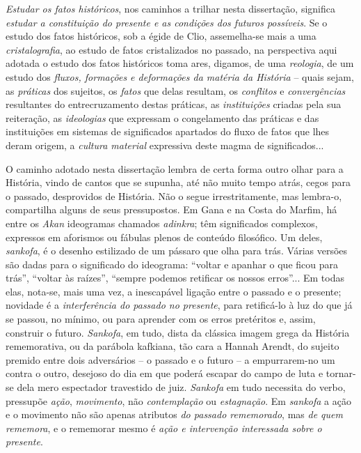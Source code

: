 \textit{Estudar os fatos históricos}, nos caminhos a trilhar nesta dissertação, significa \textit{estudar a constituição do presente e as condições dos futuros possíveis}. Se o estudo dos fatos históricos, sob a égide de Clio, assemelha-se mais a uma \textit{cristalografia}, ao estudo de fatos cristalizados no passado, na perspectiva aqui adotada o estudo dos fatos históricos toma ares, digamos, de uma \textit{reologia}, de um estudo dos \textit{fluxos, formações e deformações da matéria da História} – quais sejam, as \textit{práticas} dos sujeitos, os \textit{fatos} que delas resultam, os \textit{conflitos} e \textit{convergências} resultantes do entrecruzamento destas práticas, as \textit{instituições} criadas pela sua reiteração, as \textit{ideologias} que expressam o congelamento das práticas e das instituições em sistemas de significados apartados do fluxo de fatos que lhes deram origem, a \textit{cultura material} expressiva deste magma de significados...

O caminho adotado nesta dissertação lembra de certa forma outro olhar para a História, vindo de cantos que se supunha, até não muito tempo atrás, cegos para o passado, desprovidos de História. Não o segue irrestritamente, mas lembra-o, compartilha alguns de seus pressupostos. Em Gana e na Costa do Marfim, há entre os \textit{Akan} ideogramas chamados \textit{adinkra}; têm significados complexos, expressos em aforismos ou fábulas plenos de conteúdo filosófico. Um deles, \textit{sankofa}, é o desenho estilizado de um pássaro que olha para trás. Várias versões são dadas para o significado do ideograma: ``voltar e apanhar o que ficou para trás'', ``voltar às raízes'', ``sempre podemos retificar os nossos erros''... Em todas elas, nota-se, mais uma vez, a inescapável ligação entre o passado e o presente; novidade é a \textit{interferência do passado no presente}, para retificá-lo à luz do que já se passou, no mínimo, ou para aprender com os erros pretéritos e, assim, construir o futuro. \textit{Sankofa}, em tudo, dista da clássica imagem grega da História rememorativa, ou da parábola kafkiana, tão cara a Hannah Arendt, do sujeito premido entre dois adversários -- o passado e o futuro -- a empurrarem-no um contra o outro, desejoso do dia em que poderá escapar do campo de luta e tornar-se dela mero espectador travestido de juiz. \textit{Sankofa} em tudo necessita do verbo, pressupõe \textit{ação}, \textit{movimento}, não \textit{contemplação} ou \textit{estagnação}. Em \textit{sankofa} a ação e o movimento não são apenas atributos \textit{do passado rememorado}, mas \textit{de quem rememora}, e o rememorar mesmo é \textit{ação e intervenção interessada sobre o presente}.

